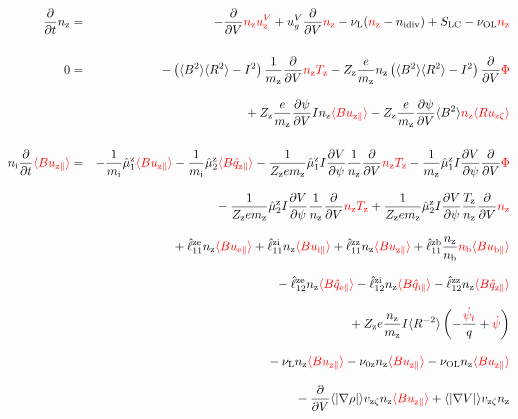 \documentclass[11pt]{article}
\def\r#1{{\rm#1}}
\def\aves#1{\langle#1\rangle}
\def\dd#1#2{\frac{\partial #1}{\partial #2}}
\def\para{\parallel}
\def\ddV{\frac{\partial}{\partial V}}
\def\ddt{\frac{\partial}{\partial t}}
\def\psid{\dot{\psi}}
\def\psit{\psi_t}
\def\psitd{\dot{\psit}}
\def\mi{m_\r{i}}
\def\mz{m_\r{z}}
\def\ni{n_\r{i}}
\def\nz{n_\r{z}}
\def\nb{n_\r{b}}
\def\Tz{T_\r{z}}
\def\Zz{Z_\r{z}}
\def\uzt#1{u_{\r{#1}\zeta}}
\def\upara#1{u_{\r{#1}\para}}
\def\qhatpara#1{\hat{q}_{\r{#1}\para}}
\def\uV#1{u_\r{#1}^V}
\def\ugV{u_{g}^V}
\def\nun#1{\nu_\r{0#1}}
\def\ndiv#1{n_\r{#1div}}
\def\bri{\aves{B^2}\aves{R^2} - I^2}
\def\nuL{\nu_\r{L}}
\def\nuOL{\nu_\r{OL}}
\def\red#1{\textcolor{red}{#1}}
\begin{document}
%
\begin{eqnarray}
  \ddt \nz &=&
%
  - \ddV \red{\nz\uV{z}}
%
  + \ugV \ddV \red{\nz}
%
  - \nuL (\red{\nz} - \ndiv{i}) 
%
  + S_\r{LC}
%
  - \nuOL \red{\nz}
%
\\[5mm]
  0 &=&
%
  -           \left( \bri \right) \frac{1}{\mz} \ddV \red{\nz \Tz}
%
  - \Zz \frac{e}{\mz} \nz \left( \bri \right) \ddV \red{\Phi}
\nonumber\\[3mm]&&{}
%
  + \Zz \frac{e}{\mz} \dd{\psi}{V} I \nz \red{\aves{B\upara{z}}}
%
  - \Zz \frac{e}{\mz} \dd{\psi}{V} \aves{B^2} \red{\nz \aves{R\uzt{z}}}
\\[5mm]
  \ni \ddt \red{\aves{B \upara{z}}} &=&
%
  - \frac{1}{\mi} \hat{\mu}_1^\r{z} \red{\aves{B \upara{z}}}
  - \frac{1}{\mi} \hat{\mu}_2^\r{z} \red{\aves{B \qhatpara{z}}}
%
  - \frac{1}{\Zz e\mz} \hat{\mu}_1^\r{z} I \dd{V}{\psi} \frac{1}{\nz}
  \ddV \red{\nz\Tz}
  - \frac{1}{\mz} \hat{\mu}_1^\r{z} I \dd{V}{\psi} \ddV \red{\Phi}
\nonumber\\[3mm]&&{}
%
  - \frac{1}{\Zz e\mz} \hat{\mu}_2^\r{z} I \dd{V}{\psi} \frac{1}{\nz}
  \ddV \red{\nz\Tz}
  + \frac{1}{\Zz e\mz} \hat{\mu}_2^\r{z} I \dd{V}{\psi} \frac{\Tz}{\nz}
  \ddV \red{\nz}
\nonumber\\[3mm]&&{}
%
  + \hat{\ell}_{11}^{\r{ze}} \nz \red{\aves{B \upara{e}}}
  + \hat{\ell}_{11}^{\r{zi}} \nz \red{\aves{B \upara{i}}}
  + \hat{\ell}_{11}^{\r{zz}} \nz \red{\aves{B \upara{z}}}
  + \hat{\ell}_{11}^{\r{zb}} \frac{\nz}{\nb} \red{\nb \aves{B \upara{b}}}
\nonumber\\[3mm]&&{}
%
  - \hat{\ell}_{12}^{\r{ze}} \nz \red{\aves{B \qhatpara{e}}}
  - \hat{\ell}_{12}^{\r{zi}} \nz \red{\aves{B \qhatpara{i}}}
  - \hat{\ell}_{12}^{\r{zz}} \nz \red{\aves{B \qhatpara{z}}}
\nonumber\\[3mm]&&{}
%
  + \Zz e \frac{\nz}{\mz} I \aves{R^{-2}} \left( - \frac{\red{\psitd}}{q} + \red{\psid} \right)
%
%
\nonumber\\[3mm]&&{}
%
  - \nuL  \nz \red{\aves{B \upara{z}}}
%
  - \nun{z} \nz \red{\aves{B \upara{z}}}
%
  - \nuOL \nz \red{\aves{B \upara{z}}}
\nonumber\\[3mm]&&{}
%
  - \ddV \aves{|\nabla \rho|} v_{\r{z}\zeta} \nz \red{\aves{B \upara{z}}}
%
  + \aves{|\nabla V|} v_{\r{z}\zeta} \nz 

\end{eqnarray}
\end{document}
